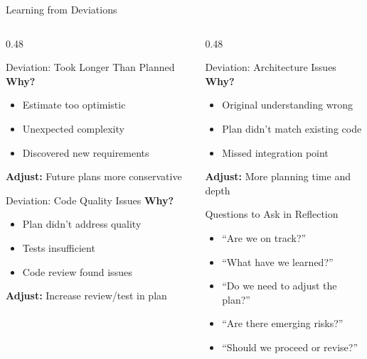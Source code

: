 \documentclass[aspectratio=169,10pt]{beamer}
\begin{document}
\begin{frame}{Learning from Deviations}
    \begin{columns}[T]
        \begin{column}{0.48\textwidth}
            \begin{alertblock}{Deviation: Took Longer Than Planned}
                \textbf{Why?}
                \begin{itemize}
                    \item Estimate too optimistic
                    \item Unexpected complexity
                    \item Discovered new requirements
                \end{itemize}
                \textbf{Adjust:} Future plans more conservative
            \end{alertblock}
            \begin{alertblock}{Deviation: Code Quality Issues}
                \textbf{Why?}
                \begin{itemize}
                    \item Plan didn't address quality
                    \item Tests insufficient
                    \item Code review found issues
                \end{itemize}
                \textbf{Adjust:} Increase review/test in plan
            \end{alertblock}
        \end{column}
        \begin{column}{0.48\textwidth}
            \begin{alertblock}{Deviation: Architecture Issues}
                \textbf{Why?}
                \begin{itemize}
                    \item Original understanding wrong
                    \item Plan didn't match existing code
                    \item Missed integration point
                \end{itemize}
                \textbf{Adjust:} More planning time and depth
            \end{alertblock}
            \begin{block}{Questions to Ask in Reflection}
                \begin{itemize}
                    \item ``Are we on track?''
                    \item ``What have we learned?''
                    \item ``Do we need to adjust the plan?''
                    \item ``Are there emerging risks?''
                    \item ``Should we proceed or revise?''
                \end{itemize}
            \end{block}
        \end{column}
    \end{columns}


\end{frame}
\end{document}
